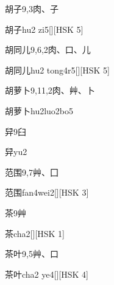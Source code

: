 \begin{entry}{胡子}{9,3}{⾁、⼦}
  \begin{phonetics}{胡子}{hu2 zi5}[][HSK 5]
  \end{phonetics}
\end{entry}

\begin{entry}{胡同儿}{9,6,2}{⾁、⼝、⼉}
  \begin{phonetics}{胡同儿}{hu2 tong4r5}[][HSK 5]
  \end{phonetics}
\end{entry}

\begin{entry}{胡萝卜}{9,11,2}{⾁、⾋、⼘}
  \begin{phonetics}{胡萝卜}{hu2luo2bo5}
  \end{phonetics}
\end{entry}

\begin{entry}{舁}{9}{⾅}
  \begin{phonetics}{舁}{yu2}
  \end{phonetics}
\end{entry}

\begin{entry}{范围}{9,7}{⾋、⼞}
  \begin{phonetics}{范围}{fan4wei2}[][HSK 3]
  \end{phonetics}
\end{entry}

\begin{entry}{茶}{9}{⾋}
  \begin{phonetics}{茶}{cha2}[][HSK 1]
  \end{phonetics}
\end{entry}

\begin{entry}{茶叶}{9,5}{⾋、⼝}
  \begin{phonetics}{茶叶}{cha2 ye4}[][HSK 4]
  \end{phonetics}
\end{entry}

